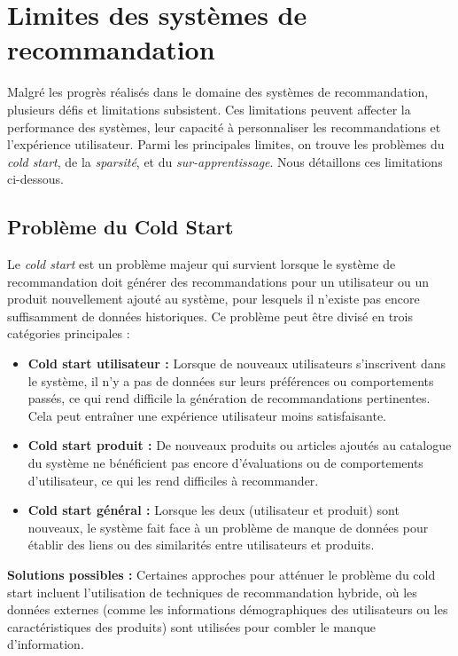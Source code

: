 \section{Limites des systèmes de recommandation}

Malgré les progrès réalisés dans le domaine des systèmes de recommandation, plusieurs défis et limitations subsistent. Ces limitations peuvent affecter la performance des systèmes, leur capacité à personnaliser les recommandations et l’expérience utilisateur. Parmi les principales limites, on trouve les problèmes du \textit{cold start}, de la \textit{sparsité}, et du \textit{sur-apprentissage}. Nous détaillons ces limitations ci-dessous.

\subsection{Problème du Cold Start}

Le \textit{cold start} est un problème majeur qui survient lorsque le système de recommandation doit générer des recommandations pour un utilisateur ou un produit nouvellement ajouté au système, pour lesquels il n'existe pas encore suffisamment de données historiques. Ce problème peut être divisé en trois catégories principales :

\begin{itemize}
    \item \textbf{Cold start utilisateur :} Lorsque de nouveaux utilisateurs s'inscrivent dans le système, il n'y a pas de données sur leurs préférences ou comportements passés, ce qui rend difficile la génération de recommandations pertinentes. Cela peut entraîner une expérience utilisateur moins satisfaisante.
    \item \textbf{Cold start produit :} De nouveaux produits ou articles ajoutés au catalogue du système ne bénéficient pas encore d'évaluations ou de comportements d'utilisateur, ce qui les rend difficiles à recommander.
    \item \textbf{Cold start général :} Lorsque les deux (utilisateur et produit) sont nouveaux, le système fait face à un problème de manque de données pour établir des liens ou des similarités entre utilisateurs et produits.
\end{itemize}

\textbf{Solutions possibles :} Certaines approches pour atténuer le problème du cold start incluent l’utilisation de techniques de recommandation hybride, où les données externes (comme les informations démographiques des utilisateurs ou les caractéristiques des produits) sont utilisées pour combler le manque d'information.

